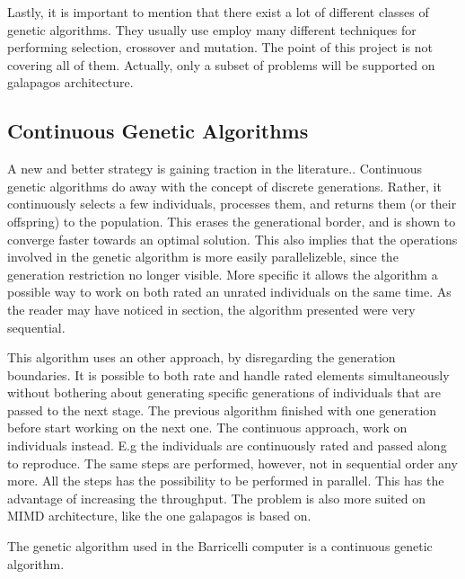 Lastly, it is important to mention that there exist a lot of different classes of genetic algorithms. They usually use employ many different techniques for performing selection, crossover and mutation. The point of this project is not covering all of them. Actually, only a subset of problems will be supported on galapagos architecture. 




\subsection{Continuous Genetic Algorithms}

A new and better strategy is gaining traction in the literature..
Continuous genetic algorithms do away with the concept of discrete generations.
Rather, it continuously selects a few individuals, processes them, and returns them (or their offspring) to the population.
This erases the generational border, and is shown  to converge faster towards an optimal solution. This also implies that the operations involved in the genetic algorithm is  more easily parallelizeble, since the generation restriction no longer visible. More specific it allows the algorithm a possible way to work on both rated an unrated individuals on the same time. As the reader may have noticed in section, the algorithm presented were very sequential. 

This algorithm uses an other approach, by disregarding the generation boundaries. It is possible to both rate and handle rated elements simultaneously without bothering about generating specific generations of individuals that are passed to the next stage. The previous algorithm finished with one generation before start working on the next one. The continuous approach, work on individuals instead. E.g the individuals are continuously rated and passed along to reproduce. The same steps are performed, however, not in sequential order any more. All the steps has the possibility to be performed in parallel. This has the advantage of increasing the throughput. The problem is also more suited on MIMD architecture, like the one galapagos is based on.      





The genetic algorithm used in the Barricelli computer is a continuous genetic algorithm.


